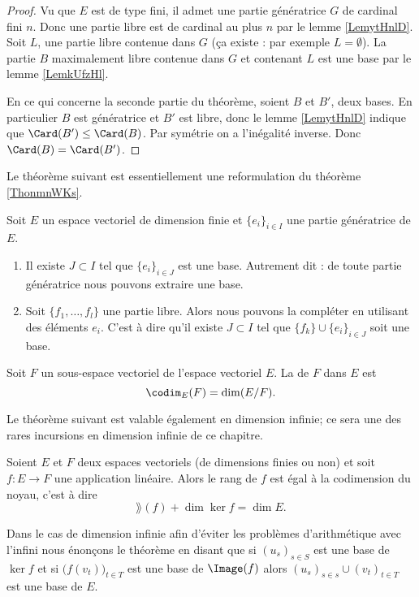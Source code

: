 \begin{proof}
    Vu que \( E\) est de type fini, il admet une partie génératrice \( G\) de cardinal fini \( n\). Donc une partie libre est de cardinal au plus \( n\) par le lemme \ref{LemytHnlD}. Soit \( L\), une partie libre contenue dans \( G\) (ça existe : par exemple \( L=\emptyset\)). La partie \( B\) maximalement libre contenue dans \( G\) et contenant \( L\) est une base par le lemme \ref{LemkUfzHl}.

    En ce qui concerne la seconde partie du théorème, soient \( B\) et \( B'\), deux bases. En particulier \( B\) est génératrice et \( B'\) est libre, donc le lemme \ref{LemytHnlD} indique que \( \Card(B')\leq \Card(B)\). Par symétrie on a l'inégalité inverse. Donc \( \Card(B)=\Card(B')\).
\end{proof}

Le théorème suivant est essentiellement une reformulation du théorème \ref{ThonmnWKs}.
\begin{theorem} \label{ThoBaseIncompjblieG}
    Soit \( E\) un espace vectoriel de dimension finie et \( \{ e_i \}_{i\in I}\) une partie génératrice de \( E\).

    \begin{enumerate}
        \item
            Il existe \( J\subset I\) tel que \( \{ e_i \}_{i\in J}\) est une base. Autrement dit : de toute partie génératrice nous pouvons extraire une base.
        \item
            Soit \( \{ f_1,\ldots, f_l \}\) une partie libre. Alors nous pouvons la compléter en utilisant des éléments \( e_i\). C'est à dire qu'il existe \( J\subset I\) tel que \( \{ f_k \}\cup\{ e_i \}_{i\in J}\) soit une base.
    \end{enumerate}
\end{theorem}

Soit \( F\) un sous-espace vectoriel de l'espace vectoriel \( E\). La  de \( F\) dans \( E\) est
\begin{equation}
    \codim_E(F)=\dim(E/F).
\end{equation}

Le théorème suivant est valable également en dimension infinie; ce sera une des rares incursions en dimension infinie de ce chapitre.
\begin{theorem}       \label{ThoGkkffA}
       Soient \( E\) et \( F\) deux espaces vectoriels (de dimensions finies ou non) et soit \( f\colon E\to F\) une application linéaire. Alors le rang de \( f\) est égal à la codimension du noyau, c'est à dire
       \begin{equation}
           \rang(f)+\dim\ker f=\dim E.
       \end{equation}

       Dans le cas de dimension infinie afin d'éviter les problèmes d'arithmétique avec l'infini nous énonçons le théorème en disant que si \( (u_s)_{s\in S}\) est une base de \( \ker f\) et si \( \big( f(v_t) \big)_{t\in T}\) est une base de \( \Image(f)\) alors  \( (u_s)_{s\in s}\cup (v_t)_{t\in T}\) est une base de \( E\).
\end{theorem}

